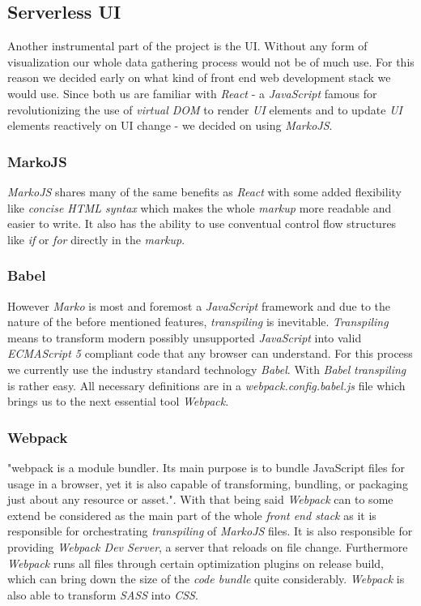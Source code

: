 \subsection{Serverless UI}

Another instrumental part of the project is the UI. Without any form of visualization our whole data
gathering process would not be of much use. For this reason we decided early on what kind of front
end web development stack we would use. Since both us are familiar with \textit{React} - a
\textit{JavaScript} famous for revolutionizing the use of \textit{virtual DOM}
to render \textit{UI} elements and to update \textit{UI} elements reactively on
UI change - we decided on using \textit{MarkoJS}.

\subsubsection{MarkoJS}

\textit{MarkoJS} shares many of the same benefits as \textit{React} with some added flexibility like
\textit{concise HTML syntax} which makes the whole \textit{markup} more readable and easier to
write. It also has the ability to use conventual control flow structures like \textit{if} or
\textit{for} directly in the \textit{markup}.

\subsubsection{Babel}

However \textit{Marko} is most and foremost a \textit{JavaScript} framework and due to the nature of
the before mentioned features, \textit{transpiling} is inevitable. \textit{Transpiling} means to
transform modern possibly unsupported \textit{JavaScript} into valid \textit{ECMAScript 5} compliant
code that any browser can understand. For this process we currently use the industry standard
technology \textit{Babel}. With \textit{Babel} \textit{transpiling} is rather easy. All necessary
definitions are in a \textit{webpack.config.babel.js} file which brings us to the next essential
tool \textit{Webpack}.

\subsubsection{Webpack}

"webpack is a module bundler. Its main purpose is to bundle JavaScript files for usage in a browser,
yet it is also capable of transforming, bundling, or packaging just about any resource or asset.".
With that being said \textit{Webpack} can to some extend be considered as the main part of the whole
\textit{front end stack} as it is responsible for orchestrating \textit{transpiling} of
\textit{MarkoJS} files. It is also responsible for providing \textit{Webpack Dev Server}, a server
that reloads on file change. Furthermore \textit{Webpack} runs all files through certain
optimization plugins on release build, which can bring down the size of the \textit{code bundle}
quite considerably. \textit{Webpack} is also able to transform \textit{SASS} into \textit{CSS}.

